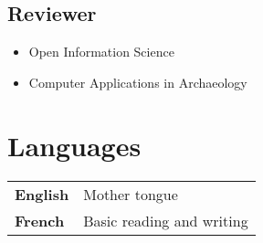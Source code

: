 \documentclass[11pt, a4paper]{article}
\newcommand{\TablePad}{\vspace{-0.4cm}}
\begin{document}
\subsection{Reviewer}
\begin{itemize}
  \item Open Information Science
  \item Computer Applications in Archaeology
\end{itemize}

\section{Languages}
\TablePad
\begin{tabularx}{\textwidth}{@{}p{} p{}@{}}
  \textbf{English} & Mother tongue
  \\
  \textbf{French}  & Basic reading and writing
\end{tabularx}
\end{document}
